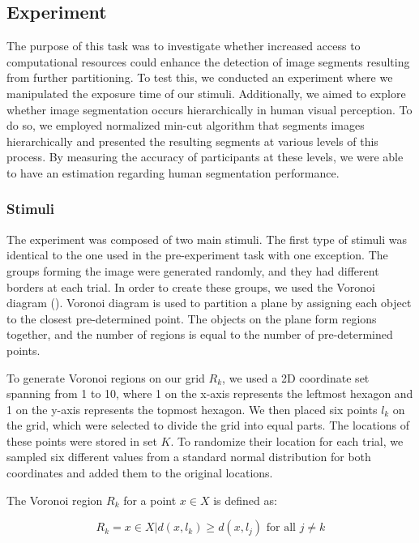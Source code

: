 \documentclass{article}
\begin{document}
\subsection{Experiment}
The purpose of this task was to investigate whether increased access to computational resources could enhance the detection of image segments resulting from further partitioning. To test this, we conducted an experiment where we manipulated the exposure time of our stimuli. Additionally, we aimed to explore whether image segmentation occurs hierarchically in human visual perception. To do so, we employed normalized min-cut algorithm that segments images hierarchically and presented the resulting segments at various levels of this process. By measuring the accuracy of participants at these levels, we were able to have an estimation regarding human segmentation performance.

\subsubsection{Stimuli}
The experiment was composed of two main stimuli. The first type of stimuli was identical to the one used in the pre-experiment task with one exception. The groups forming the image were generated randomly, and they had different borders at each trial. In order to create these groups, we used the Voronoi diagram (\cite{aurenhammer1991voronoi}). Voronoi diagram is used to partition a plane by assigning each object to the closest pre-determined point. The objects on the plane form regions together, and the number of regions is equal to the number of pre-determined points.

To generate Voronoi regions on our grid $R_k$, we used a 2D coordinate set spanning from 1 to 10, where 1 on the x-axis represents the leftmost hexagon and 1 on the y-axis represents the topmost hexagon. We then placed six points $l_k$ on the grid, which were selected to divide the grid into equal parts. The locations of these points were stored in set $K$. To randomize their location for each trial, we sampled six different values from a standard normal distribution for both coordinates and added them to the original locations.

The Voronoi region $R_k$ for a point $x \in X$ is defined as:

\begin{equation}
R_k = {x \in X | d(x, l_k) \geq d(x, l_j) \text{ for all } j \neq k}
\end{equation}
\end{document}
